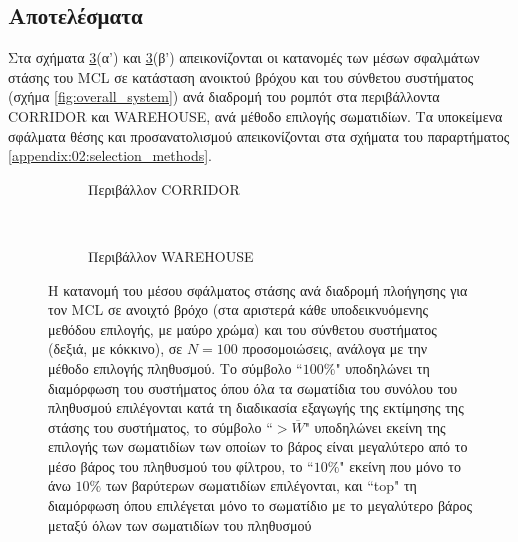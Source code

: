 \subsection{Αποτελέσματα}
\label{subsection:02_02_04:02}

Στα σχήματα \ref{fig:02_02_04:selections}(α') και
\ref{fig:02_02_04:selections}(β') απεικονίζονται οι κατανομές των μέσων
σφαλμάτων στάσης του MCL σε κατάσταση ανοικτού βρόχου και του σύνθετου
συστήματος (σχήμα \ref{fig:overall_system}) ανά διαδρομή του ρομπότ στα
περιβάλλοντα CORRIDOR και WAREHOUSE, ανά μέθοδο επιλογής σωματιδίων. Τα
υποκείμενα σφάλματα θέσης και προσανατολισμού απεικονίζονται στα σχήματα του
παραρτήματος \ref{appendix:02:selection_methods}.


\begin{figure}
  \vspace{2cm}
  \begin{subfigure}{\linewidth}
  \hspace{-1.25cm}
    
    \vspace{0.3cm}
    \caption{Περιβάλλον CORRIDOR}
    \label{fig:02_02_04:corridor_selections}
  \end{subfigure}\\
  \begin{subfigure}{\linewidth}\vspace{0.5cm}
    \hspace{-1.25cm}
    
    \vspace{0.3cm}
    \caption{Περιβάλλον WAREHOUSE}
    \label{fig:02_02_04:warehouse_selections}
  \end{subfigure}
\caption{\small Η κατανομή του μέσου σφάλματος στάσης ανά διαδρομή πλοήγησης
         για τον MCL σε ανοιχτό βρόχο (στα αριστερά κάθε υποδεικνυόμενης
         μεθόδου επιλογής, με μαύρο χρώμα) και του σύνθετου συστήματος (δεξιά,
         με κόκκινο), σε $N=100$ προσομοιώσεις, ανάλογα με την μέθοδο επιλογής
         πληθυσμού. Το σύμβολο ``$100\%$" υποδηλώνει τη διαμόρφωση του
         συστήματος όπου όλα τα σωματίδια του συνόλου του πληθυσμού επιλέγονται
         κατά τη διαδικασία εξαγωγής της εκτίμησης της στάσης του συστήματος,
         το σύμβολο ``$>\overline{W}$" υποδηλώνει εκείνη της επιλογής των
         σωματιδίων των οποίων το βάρος είναι μεγαλύτερο από το μέσο βάρος του
         πληθυσμού του φίλτρου, το ``$10\%$" εκείνη που μόνο το άνω $10\%$ των
         βαρύτερων σωματιδίων επιλέγονται, και ``top" τη διαμόρφωση όπου
         επιλέγεται μόνο το σωματίδιο με το μεγαλύτερο βάρος μεταξύ όλων των
         σωματιδίων του πληθυσμού}
\label{fig:02_02_04:selections}
\end{figure}

